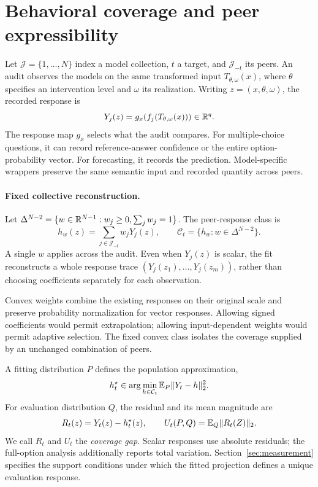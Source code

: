 \section{Behavioral coverage and peer expressibility}
\label{sec:framework}

Let $\mathcal J=\{1,\ldots,N\}$ index a model collection, $t$ a target, and $\mathcal J_{-t}$ its peers. An audit observes the models on the same transformed input $T_{\theta,\omega}(x)$, where $\theta$ specifies an intervention level and $\omega$ its realization. Writing $z=(x,\theta,\omega)$, the recorded response is
\begin{equation}
Y_j(z)=g_x\!\left(f_j(T_{\theta,\omega}(x))\right)\in\mathbb{R}^q.
\label{eq:response}
\end{equation}
The response map $g_x$ selects what the audit compares. For multiple-choice questions, it can record reference-answer confidence or the entire option-probability vector. For forecasting, it records the prediction. Model-specific wrappers preserve the same semantic input and recorded quantity across peers.

\paragraph{Fixed collective reconstruction.}
Let $\Delta^{N-2}=\{w\in\mathbb{R}^{N-1}:w_j\geq0,\sum_jw_j=1\}$. The peer-response class is
\begin{equation}
h_w(z)=\sum_{j\in\mathcal J_{-t}}w_jY_j(z),\qquad
\mathcal C_t=\{h_w:w\in\Delta^{N-2}\}.
\label{eq:peer-class}
\end{equation}
A single $w$ applies across the audit. Even when $Y_j(z)$ is scalar, the fit reconstructs a whole response trace $(Y_j(z_1),\ldots,Y_j(z_m))$, rather than choosing coefficients separately for each observation.

Convex weights combine the existing responses on their original scale and preserve probability normalization for vector responses. Allowing signed coefficients would permit extrapolation; allowing input-dependent weights would permit adaptive selection. The fixed convex class isolates the coverage supplied by an unchanged combination of peers.

A fitting distribution $P$ defines the population approximation,
\begin{equation}
h_t^\star\in\arg\min_{h\in\mathcal C_t}\mathbb{E}_P\|Y_t-h\|_2^2.
\label{eq:projection}
\end{equation}
For evaluation distribution $Q$, the residual and its mean magnitude are
\begin{equation}
R_t(z)=Y_t(z)-h_t^\star(z),\qquad
U_t(P,Q)=\mathbb{E}_Q\|R_t(Z)\|_2.
\label{eq:pier}
\end{equation}
We call $R_t$ \PIER and $U_t$ the \emph{coverage gap}. Scalar responses use absolute residuals; the full-option analysis additionally reports total variation. Section~\ref{sec:measurement} specifies the support conditions under which the fitted projection defines a unique evaluation response.

